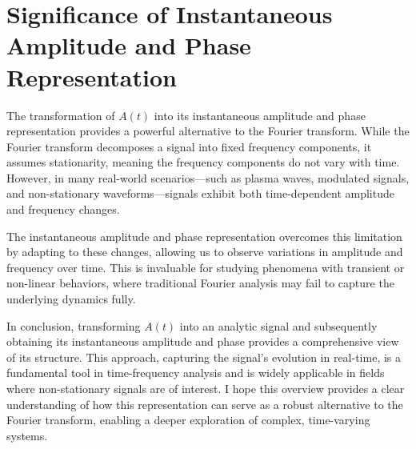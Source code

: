 \documentclass[12pt]{article}
\begin{document}
\section*{Significance of Instantaneous Amplitude and Phase Representation}

The transformation of \( A(t) \) into its instantaneous amplitude and phase representation provides a powerful alternative to the Fourier transform. While the Fourier transform decomposes a signal into fixed frequency components, it assumes stationarity, meaning the frequency components do not vary with time. However, in many real-world scenarios---such as plasma waves, modulated signals, and non-stationary waveforms---signals exhibit both time-dependent amplitude and frequency changes.

The instantaneous amplitude and phase representation overcomes this limitation by adapting to these changes, allowing us to observe variations in amplitude and frequency over time. This is invaluable for studying phenomena with transient or non-linear behaviors, where traditional Fourier analysis may fail to capture the underlying dynamics fully.

In conclusion, transforming \( A(t) \) into an analytic signal and subsequently obtaining its instantaneous amplitude and phase provides a comprehensive view of its structure. This approach, capturing the signal's evolution in real-time, is a fundamental tool in time-frequency analysis and is widely applicable in fields where non-stationary signals are of interest. I hope this overview provides a clear understanding of how this representation can serve as a robust alternative to the Fourier transform, enabling a deeper exploration of complex, time-varying systems.
\end{document}

